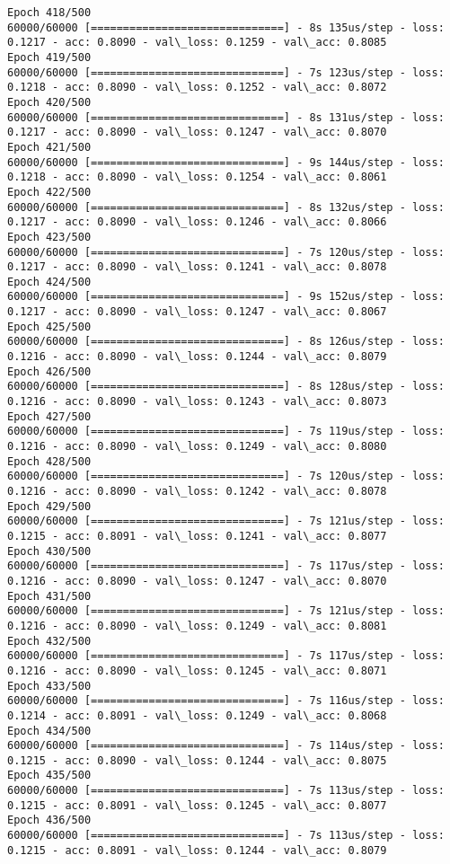 \documentclass[11pt]{article}
\begin{document}
\begin{Verbatim}[commandchars=\\\{\}]
Epoch 418/500
60000/60000 [==============================] - 8s 135us/step - loss: 0.1217 - acc: 0.8090 - val\_loss: 0.1259 - val\_acc: 0.8085
Epoch 419/500
60000/60000 [==============================] - 7s 123us/step - loss: 0.1218 - acc: 0.8090 - val\_loss: 0.1252 - val\_acc: 0.8072
Epoch 420/500
60000/60000 [==============================] - 8s 131us/step - loss: 0.1217 - acc: 0.8090 - val\_loss: 0.1247 - val\_acc: 0.8070
Epoch 421/500
60000/60000 [==============================] - 9s 144us/step - loss: 0.1218 - acc: 0.8090 - val\_loss: 0.1254 - val\_acc: 0.8061
Epoch 422/500
60000/60000 [==============================] - 8s 132us/step - loss: 0.1217 - acc: 0.8090 - val\_loss: 0.1246 - val\_acc: 0.8066
Epoch 423/500
60000/60000 [==============================] - 7s 120us/step - loss: 0.1217 - acc: 0.8090 - val\_loss: 0.1241 - val\_acc: 0.8078
Epoch 424/500
60000/60000 [==============================] - 9s 152us/step - loss: 0.1217 - acc: 0.8090 - val\_loss: 0.1247 - val\_acc: 0.8067
Epoch 425/500
60000/60000 [==============================] - 8s 126us/step - loss: 0.1216 - acc: 0.8090 - val\_loss: 0.1244 - val\_acc: 0.8079
Epoch 426/500
60000/60000 [==============================] - 8s 128us/step - loss: 0.1216 - acc: 0.8090 - val\_loss: 0.1243 - val\_acc: 0.8073
Epoch 427/500
60000/60000 [==============================] - 7s 119us/step - loss: 0.1216 - acc: 0.8090 - val\_loss: 0.1249 - val\_acc: 0.8080
Epoch 428/500
60000/60000 [==============================] - 7s 120us/step - loss: 0.1216 - acc: 0.8090 - val\_loss: 0.1242 - val\_acc: 0.8078
Epoch 429/500
60000/60000 [==============================] - 7s 121us/step - loss: 0.1215 - acc: 0.8091 - val\_loss: 0.1241 - val\_acc: 0.8077
Epoch 430/500
60000/60000 [==============================] - 7s 117us/step - loss: 0.1216 - acc: 0.8090 - val\_loss: 0.1247 - val\_acc: 0.8070
Epoch 431/500
60000/60000 [==============================] - 7s 121us/step - loss: 0.1216 - acc: 0.8090 - val\_loss: 0.1249 - val\_acc: 0.8081
Epoch 432/500
60000/60000 [==============================] - 7s 117us/step - loss: 0.1216 - acc: 0.8090 - val\_loss: 0.1245 - val\_acc: 0.8071
Epoch 433/500
60000/60000 [==============================] - 7s 116us/step - loss: 0.1214 - acc: 0.8091 - val\_loss: 0.1249 - val\_acc: 0.8068
Epoch 434/500
60000/60000 [==============================] - 7s 114us/step - loss: 0.1215 - acc: 0.8090 - val\_loss: 0.1244 - val\_acc: 0.8075
Epoch 435/500
60000/60000 [==============================] - 7s 113us/step - loss: 0.1215 - acc: 0.8091 - val\_loss: 0.1245 - val\_acc: 0.8077
Epoch 436/500
60000/60000 [==============================] - 7s 113us/step - loss: 0.1215 - acc: 0.8091 - val\_loss: 0.1244 - val\_acc: 0.8079

\end{Verbatim}
\end{document}
